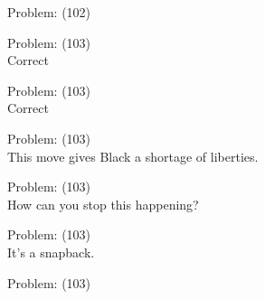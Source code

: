 \documentclass[11pt]{article}
\begin{document}
\begin{minipage}[t]{0.5\textwidth}
  {\centering
  
  Problem: (102)\\
  
  }
\end{minipage}
\begin{minipage}[t]{0.5\textwidth}
  {\centering
  
  Problem: (103)\\
  Correct\\
  }
\end{minipage}
\begin{minipage}[t]{0.5\textwidth}
  {\centering
  
  Problem: (103)\\
  Correct\\
  }
\end{minipage}
\begin{minipage}[t]{0.5\textwidth}
  {\centering
  
  Problem: (103)\\
  This move gives Black a shortage of liberties.\\
  }
\end{minipage}
\begin{minipage}[t]{0.5\textwidth}
  {\centering
  
  Problem: (103)\\
  How can you stop this happening?\\
  }
\end{minipage}
\begin{minipage}[t]{0.5\textwidth}
  {\centering
  
  Problem: (103)\\
  It's a snapback.\\
  }
\end{minipage}
\begin{minipage}[t]{0.5\textwidth}
  {\centering
  
  Problem: (103)\\
  
  }
\end{minipage}
\end{document}
